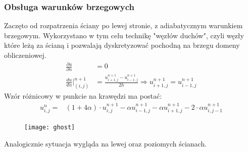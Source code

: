 \documentclass{article}
\begin{document}
\subsubsection{Obsługa warunków brzegowych}
Zaczęto od rozpatrzenia ściany po lewej stronie, z adiabatycznym warunkiem brzegowym. Wykorzystano w tym celu technikę "węzłów duchów", czyli węzły które leżą za ścianą i pozwalają dyskretyzować pochodną na brzegu domeny obliczeniowej. 
\begin{align*}
	\frac{\partial u}{\partial n} &= 0\\
	\frac{du}{dn}\Big\vert^{n+1}_{(i,j)}&= \frac{u_{i+1,j}^{n+1}-u_{i-1,j}^{n+1}}{2h}\Rightarrow u_{i+1,j}^{n+1}=u_{i-1,j}^{n+1}
\end{align*}
Wzór różnicowy w punkcie na krawędzi ma postać:
\begin{align*}
		u_{i,j}^n=& (1+4\alpha)\cdot u_{i,j}^{n+1} - \alpha u_{i-1,j}^{n+1}-\alpha u_{i+1,j}^{n+1}-2\cdot\alpha u_{i,j-1}^{n+1}
\end{align*}
\begin{figure}[H]
	\centering
	\texttt{[image: ghost]}

	\label{fig:ghost}
\end{figure}
Analogicznie sytuacja wygląda na lewej oraz poziomych ścianach.
\end{document}
